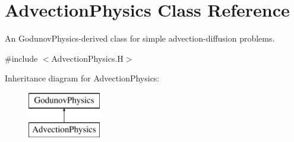 \hypertarget{class_advection_physics}{\section{Advection\-Physics Class Reference}
\label{class_advection_physics}
}


An Godunov\-Physics-\/derived class for simple advection-\/diffusion problems.  




{\ttfamily \#include $<$Advection\-Physics.\-H$>$}

Inheritance diagram for Advection\-Physics\-:\begin{figure}[H]
\begin{center}
\leavevmode
\includegraphics[height=2.000000cm]{class_advection_physics}
\end{center}
\end{figure}
